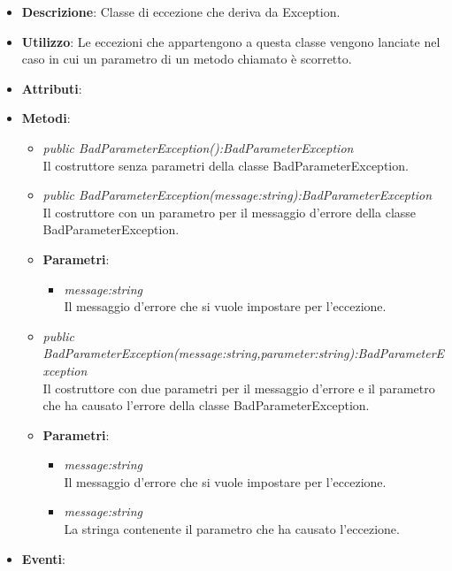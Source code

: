 \begin{itemize}
\item \textbf{Descrizione}: Classe di eccezione che deriva da Exception.
\item \textbf{Utilizzo}: Le eccezioni che appartengono a questa classe vengono lanciate nel caso in cui un parametro di un metodo chiamato è scorretto.
\item \textbf{Attributi}: 
\item \textbf{Metodi}:
	\begin{itemize}
	\item \textit{public BadParameterException():BadParameterException}\\
	Il costruttore senza parametri della classe BadParameterException.
	\item \textit{public BadParameterException(message:string):BadParameterException}\\
	Il costruttore con un parametro per il messaggio d'errore della classe BadParameterException.
			\item{\textbf{Parametri}: \begin{itemize}
			\item \textit{message:string}\\
			Il messaggio d'errore che si vuole impostare per l'eccezione.
			\end{itemize}}
	\item \textit{public BadParameterException(message:string,parameter:string):BadParameterException}\\
	Il costruttore con due parametri per il messaggio d'errore e il parametro che ha causato l'errore della classe BadParameterException.
			\item{\textbf{Parametri}: \begin{itemize}
			\item \textit{message:string}\\
			Il messaggio d'errore che si vuole impostare per l'eccezione.
			\item \textit{message:string}\\
			La stringa contenente il parametro che ha causato l'eccezione.
			\end{itemize}}
	\end{itemize}
\item \textbf{Eventi}:
\end{itemize}